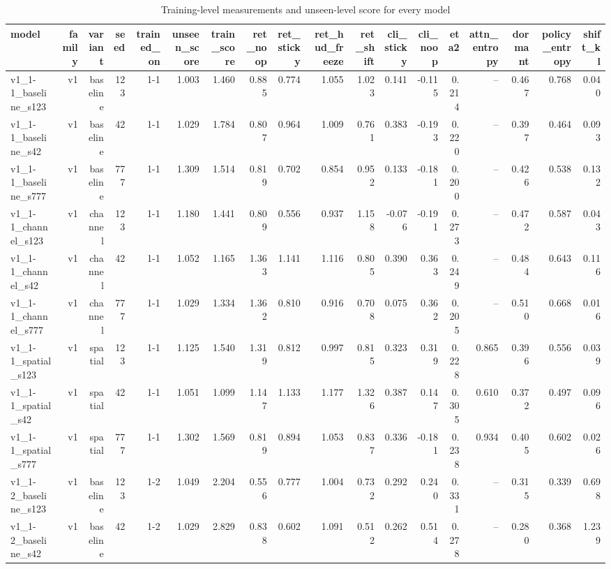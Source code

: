 \begin{table}[t]
\centering
\caption{Training-level measurements and unseen-level score for every model}
\label{tab:predictors_per_model}
\begin{tabular}{lrrrrrrrrrrrrrrrrr}
\toprule
model & family & variant & seed & trained\_on & unseen\_score & train\_score & ret\_noop & ret\_sticky & ret\_hud\_freeze & ret\_shift & cli\_sticky & cli\_noop & eta2 & attn\_entropy & dormant & policy\_entropy & shift\_kl \\
\midrule
v1\_1-1\_baseline\_s123 & v1 & baseline & 123 & 1-1 & 1.003 & 1.460 & 0.885 & 0.774 & 1.055 & 1.023 & 0.141 & -0.115 & 0.214 & -- & 0.467 & 0.768 & 0.040 \\
v1\_1-1\_baseline\_s42 & v1 & baseline & 42 & 1-1 & 1.029 & 1.784 & 0.807 & 0.964 & 1.009 & 0.761 & 0.383 & -0.193 & 0.220 & -- & 0.397 & 0.464 & 0.093 \\
v1\_1-1\_baseline\_s777 & v1 & baseline & 777 & 1-1 & 1.309 & 1.514 & 0.819 & 0.702 & 0.854 & 0.952 & 0.133 & -0.181 & 0.200 & -- & 0.426 & 0.538 & 0.132 \\
v1\_1-1\_channel\_s123 & v1 & channel & 123 & 1-1 & 1.180 & 1.441 & 0.809 & 0.556 & 0.937 & 1.158 & -0.076 & -0.191 & 0.273 & -- & 0.472 & 0.587 & 0.043 \\
v1\_1-1\_channel\_s42 & v1 & channel & 42 & 1-1 & 1.052 & 1.165 & 1.363 & 1.141 & 1.116 & 0.805 & 0.390 & 0.363 & 0.249 & -- & 0.484 & 0.643 & 0.116 \\
v1\_1-1\_channel\_s777 & v1 & channel & 777 & 1-1 & 1.029 & 1.334 & 1.362 & 0.810 & 0.916 & 0.708 & 0.075 & 0.362 & 0.205 & -- & 0.510 & 0.668 & 0.016 \\
v1\_1-1\_spatial\_s123 & v1 & spatial & 123 & 1-1 & 1.125 & 1.540 & 1.319 & 0.812 & 0.997 & 0.815 & 0.323 & 0.319 & 0.228 & 0.865 & 0.396 & 0.556 & 0.039 \\
v1\_1-1\_spatial\_s42 & v1 & spatial & 42 & 1-1 & 1.051 & 1.099 & 1.147 & 1.133 & 1.177 & 1.326 & 0.387 & 0.147 & 0.305 & 0.610 & 0.372 & 0.497 & 0.096 \\
v1\_1-1\_spatial\_s777 & v1 & spatial & 777 & 1-1 & 1.302 & 1.569 & 0.819 & 0.894 & 1.053 & 0.837 & 0.336 & -0.181 & 0.238 & 0.934 & 0.405 & 0.602 & 0.026 \\
v1\_1-2\_baseline\_s123 & v1 & baseline & 123 & 1-2 & 1.049 & 2.204 & 0.556 & 0.777 & 1.004 & 0.732 & 0.292 & 0.240 & 0.331 & -- & 0.315 & 0.339 & 0.698 \\
v1\_1-2\_baseline\_s42 & v1 & baseline & 42 & 1-2 & 1.029 & 2.829 & 0.838 & 0.602 & 1.091 & 0.512 & 0.262 & 0.514 & 0.278 & -- & 0.280 & 0.368 & 1.239 \\

\end{tabular}
\end{table}
